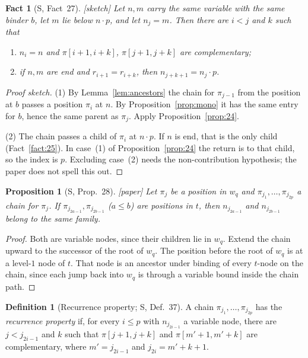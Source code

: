 \documentclass[11pt]{article}
\newcommand{\suc}[2]{#1{\cdot}#2}
\newcommand{\iv}[2]{\pi[#1,#2]}
\newcommand{\Paper}{\textsf{[paper]}}
\newcommand{\Sketch}{\textsf{[sketch]}}
\theoremstyle{plain}
\newtheorem{proposition}[theorem]{Proposition}
\newtheorem{fact}[theorem]{Fact}
\theoremstyle{definition}
\newtheorem{definition}[theorem]{Definition}
\theoremstyle{remark}
\begin{document}
\begin{fact}[S, Fact~27]\label{fact:27}
\Sketch{} Let $n,m$ carry the same variable with the same binder $b$,
let $m$ lie below $\suc np$, and let $n_j=m$.  Then there are $i<j$ and
$k$ such that
\begin{enumerate}
\item $n_i=n$ and $\iv{i+1}{i+k}$, $\iv{j+1}{j+k}$ are complementary;
\item if $n,m$ are end and $r_{i+1}=r_{i+k}$, then $n_{j+k+1}=\suc{n_j}p$.
\end{enumerate}
\end{fact}
\begin{proof}[Proof sketch]
(1) By Lemma~\ref{lem:ancestors} the chain for $\pi_{j-1}$ from the
position at $b$ passes a position $\pi_i$ at $n$.  By
Proposition~\ref{prop:mono} it has the same entry for $b$, hence the
same parent as $\pi_j$.  Apply Proposition~\ref{prop:24}.

(2) The chain passes a child of $\pi_i$ at $\suc np$.  If $n$ is end,
that is the only child (Fact~\ref{fact:25}).  In case~(1) of
Proposition~\ref{prop:24} the return is to that child, so the index is
$p$.  Excluding case~(2) needs the non-contribution hypothesis; the
paper does not spell this out.
\end{proof}

\begin{proposition}[S, Prop.~28]\label{prop:28}
\Paper{} Let $\pi_j$ be a position in $w_q$ and
$\pi_{j_1},\dots,\pi_{j_{2p}}$ a chain for $\pi_j$.  If
$\pi_{j_{2a-1}},\pi_{j_{2b-1}}$ ($a\le b$) are positions in $t$, then
$n_{j_{2a-1}}$ and $n_{j_{2b-1}}$ belong to the same family.
\end{proposition}
\begin{proof}
Both are variable nodes, since their children lie in $w_q$.  Extend the
chain upward to the successor of the root of $w_q$.  The position before
the root of $w_q$ is at a level-$1$ node of $t$.  That node is an
ancestor under binding of every $t$-node on the chain, since each jump
back into $w_q$ is through a variable bound inside the chain path.
\end{proof}

\begin{definition}[Recurrence property; S, Def.~37]\label{def:recurrence}
A chain $\pi_{j_1},\dots,\pi_{j_{2p}}$ has the \emph{recurrence property}
if, for every $i\le p$ with $n_{j_{2i-1}}$ a variable node, there are
$j<j_{2i-1}$ and $k$ such that $\iv{j+1}{j+k}$ and
$\iv{m'+1}{m'+k}$ are complementary, where $m'=j_{2i-1}$ and
$j_{2i}=m'+k+1$.
\end{definition}
\end{document}
